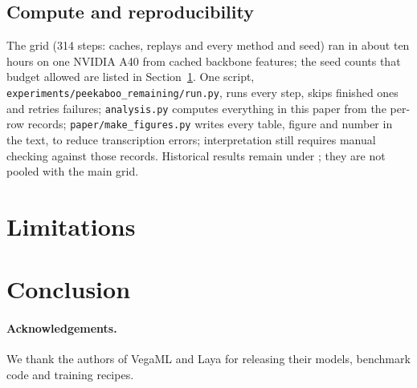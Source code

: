 \documentclass[11pt]{article}
\begin{document}
\subsection{Compute and reproducibility}
The grid (314 steps: caches, replays and every method and seed) ran in about ten hours on one NVIDIA A40 from cached backbone features; the seed counts that budget allowed are listed in Section~\ref{sec:limitations}. One script, \texttt{experiments/peekaboo\_remaining/run.py}, runs every step, skips finished ones and retries failures; \texttt{analysis.py} computes everything in this paper from the per-row records; \texttt{paper/make\_figures.py} writes every table, figure and number in the text, to reduce transcription errors; interpretation still requires manual checking against those records. Historical results remain under ; they are not pooled with the main grid.



\section{Limitations}
\label{sec:limitations}


\section{Conclusion}


\paragraph{Acknowledgements.}
We thank the authors of VegaML and Laya for releasing their models, benchmark code and training recipes.

\FloatBarrier



\appendix

\end{document}

